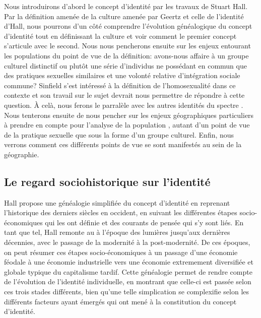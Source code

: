 Nous introduirons d'abord le concept d'identité par les travaux de Stuart Hall.
Par la définition amenée de la culture amenée par Geertz et celle de l'identité d'Hall, nous pourrons d'un côté comprendre l'évolution généalogique du concept d'identité tout en définissant la culture et voir comment le premier concept s'articule avec le second.
Nous nous pencherons ensuite sur les enjeux entourant les populations \lgbt{} du point de vue de la définition: avons-nous affaire à un groupe culturel distinctif ou plutôt une série d'individus ne possédant en commun que des pratiques sexuelles similaires et une volonté relative d'intégration sociale commune?
Sinfield s'est intéressé à la définition de l'homosexualité dans ce contexte et son travail sur le sujet devrait nous permettre de répondre à cette question.
À celà, nous ferons le parralèle avec les autres identités du spectre \lgbt{}.
Nous tenterons ensuite de nous pencher sur les enjeux géographiques particuliers à prendre en compte pour l'analyse de la population \lgbt{}, autant d'un point de vue de la pratique sexuelle que sous la forme d'un groupe culturel.
Enfin, nous verrons comment ces différents points de vue se sont manifestés au sein de la géographie.

\subsection{Le regard sociohistorique sur l'identité}
\label{sec:le_regard_sociohistoirique_sur_l_identit_} 
Hall propose une généalogie simplifiée du concept d'identité en reprenant l'historique des derniers siècles en occident, en suivant les différentes étapes socio-économiques qui les ont définie et des courants de pensée qui s'y sont liés.
En tant que tel, Hall remonte au  à l'époque des lumières jusqu'aux dernières décennies, avec le passage de la modernité à la post-modernité.
De ces époques, on peut résumer ces étapes socio-économiques à un passage d'une économie féodale à une économie industrielle vers une économie extremement diversifiée et globale typique du capitalisme tardif.
Cette généalogie permet de rendre compte de l'évolution de l'identité individuelle, en montrant que celle-ci est passée selon ces trois stades différents, bien qu'une telle simplication se complexifie selon les différents facteurs ayant émergés qui ont mené à la constitution du concept d'identité.

